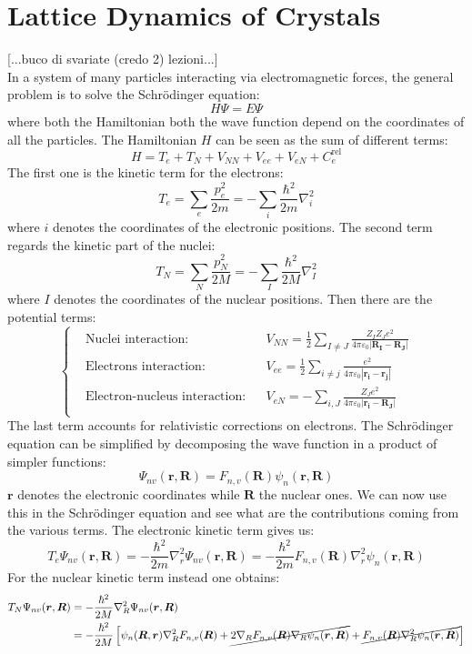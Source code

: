 \documentclass[10.75pt,a4paper,openright,bottom=2cm]{article}
\renewcommand{\Vec}[1]{\boldsymbol{#1}}
\begin{document}
\section{Lattice Dynamics of Crystals}
[...buco di svariate (credo 2) lezioni...]\\
In a system of many particles interacting via electromagnetic forces, the general problem is to solve the Schr\"odinger equation:
\[
H\Psi=E\Psi
\]
where both the Hamiltonian both the wave function depend on the coordinates of all the particles. The Hamiltonian $H$ can be seen as the sum of different terms:
\[
H=T_e+T_N+V_{NN}+V_{ee}+V_{eN}+C_e^{\text{rel}}
\]
The first one is the kinetic term for the electrons:
\[
T_e=\sum_e\frac{p_e^2}{2m}=-\sum_i\frac{\hbar^2}{2m}\nabla_i^2
\]
where $i$ denotes the coordinates of the electronic positions. The second term regards the kinetic part of the nuclei:
\[
T_N=\sum_N\frac{p_N^2}{2M}=-\sum_I\frac{\hbar^2}{2M}\nabla^2_I
\]
where $I$ denotes the coordinates of the nuclear positions. Then there are the potential terms:
\[
\left\{
\begin{aligned}
&\text{Nuclei interaction:} &&V_{NN}=\frac{1}{2}\sum_{I\neq J}\frac{Z_IZ_Je^2}{4\pi\varepsilon_0|\Vec{R_I}-\Vec{R_J}|}\\
&\text{Electrons interaction:} &&V_{ee}=\frac{1}{2}\sum_{i\neq j}\frac{e^2}{4\pi\varepsilon_0|\Vec{r_i}-\Vec{r_j}|}\\
&\text{Electron-nucleus interaction:} &&V_{eN}=-\sum_{i,J}\frac{Z_Je^2}{4\pi\varepsilon_0|\Vec{r_i}-\Vec{R_J}|}\\
\end{aligned}
\right.
\]
The last term accounts for relativistic corrections on electrons. The Schr\"odinger equation can be simplified by decomposing the wave function in a product of simpler functions:
\[
\Psi_{nv}(\Vec{r},\Vec{R})=F_{n,v}(\Vec{R})\psi_n(\Vec{r},\Vec{R})
\]
$\Vec{r}$ denotes the electronic coordinates while $\Vec{R}$ the nuclear ones. We can now use this in the Schr\"odinger equation and see what are the contributions coming from the various terms. The electronic kinetic term gives us:
\[
T_e\Psi_{nv}(\Vec{r},\Vec{R})=-\frac{\hbar^2}{2m}\nabla_r^2\Psi_{nv}(\Vec{r},\Vec{R})=-\frac{\hbar^2}{2m}F_{n,v}(\Vec{R})\nabla_r^2\psi_n(\Vec{r},\Vec{R})
\]
For the nuclear kinetic term instead one obtains:
\begin{align*}
T_N\Psi_{nv}(\Vec{r},\Vec{R})&=-\frac{\hbar^2}{2M}\nabla_R^2\Psi_{nv}(\Vec{r},\Vec{R})\\
&=-\frac{\hbar^2}{2M}\left[\psi_n(\Vec{R},\Vec{r})\nabla_R^2F_{n,v}(\Vec{R})+\cancel{2\nabla_RF_{n,v}(\Vec{R})\nabla_R\psi_n(\Vec{r},\Vec{R})}+\cancel{F_{n,v}(\Vec{R})\nabla_R^2\psi_n(\Vec{r},\Vec{R})}\right]
\end{align*}
\end{document}

